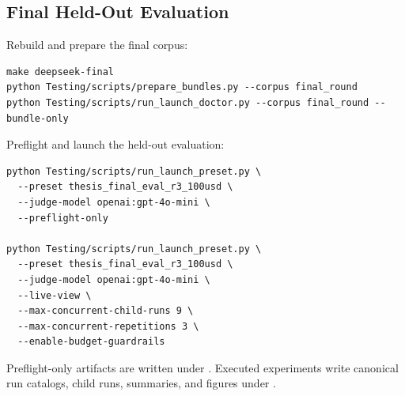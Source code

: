 \subsection*{Final Held-Out Evaluation}

Rebuild and prepare the final corpus:

\begin{verbatim}
make deepseek-final
python Testing/scripts/prepare_bundles.py --corpus final_round
python Testing/scripts/run_launch_doctor.py --corpus final_round --bundle-only
\end{verbatim}

Preflight and launch the held-out evaluation:

\begin{verbatim}
python Testing/scripts/run_launch_preset.py \
  --preset thesis_final_eval_r3_100usd \
  --judge-model openai:gpt-4o-mini \
  --preflight-only

python Testing/scripts/run_launch_preset.py \
  --preset thesis_final_eval_r3_100usd \
  --judge-model openai:gpt-4o-mini \
  --live-view \
  --max-concurrent-child-runs 9 \
  --max-concurrent-repetitions 3 \
  --enable-budget-guardrails
\end{verbatim}

Preflight-only artifacts are written under . Executed experiments write canonical run catalogs, child runs, summaries, and figures under .
